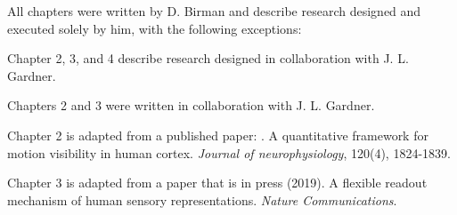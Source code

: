 All chapters were written by D. Birman and describe research designed and executed solely by him, with the following exceptions:


Chapter 2, 3, and 4 describe research designed in collaboration with J. L. Gardner. 


Chapters 2 and 3 were written in collaboration with J. L. Gardner. 


Chapter 2 is adapted from a published paper: \citet{Birman2018-sp}. A quantitative framework for motion visibility in human cortex. \textit{Journal of neurophysiology}, 120(4), 1824-1839.


Chapter 3 is adapted from a paper that is in press \citet{Birman_undated-vk} (2019). A flexible readout mechanism of human sensory representations. \textit{Nature Communications}. 